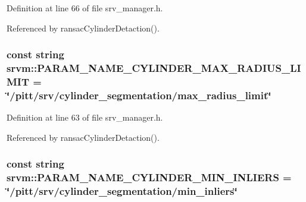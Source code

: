Definition at line 66 of file srv\-\_\-manager.\-h.



Referenced by ransac\-Cylinder\-Detaction().

\hypertarget{namespacesrvm_a85b64ea120e2c925a89075ad4efce82a}{
\subsubsection[{P\-A\-R\-A\-M\-\_\-\-N\-A\-M\-E\-\_\-\-C\-Y\-L\-I\-N\-D\-E\-R\-\_\-\-M\-A\-X\-\_\-\-R\-A\-D\-I\-U\-S\-\_\-\-L\-I\-M\-I\-T}]{\setlength{\rightskip}{0pt plus 5cm}const string srvm\-::\-P\-A\-R\-A\-M\-\_\-\-N\-A\-M\-E\-\_\-\-C\-Y\-L\-I\-N\-D\-E\-R\-\_\-\-M\-A\-X\-\_\-\-R\-A\-D\-I\-U\-S\-\_\-\-L\-I\-M\-I\-T = \char`\"{}/pitt/srv/cylinder\-\_\-segmentation/max\-\_\-radius\-\_\-limit\char`\"{}}}\label{namespacesrvm_a85b64ea120e2c925a89075ad4efce82a}


Definition at line 63 of file srv\-\_\-manager.\-h.



Referenced by ransac\-Cylinder\-Detaction().

\hypertarget{namespacesrvm_a1cf16bab1dafeefe6d5f6a58432ecbc0}{
\subsubsection[{P\-A\-R\-A\-M\-\_\-\-N\-A\-M\-E\-\_\-\-C\-Y\-L\-I\-N\-D\-E\-R\-\_\-\-M\-I\-N\-\_\-\-I\-N\-L\-I\-E\-R\-S}]{\setlength{\rightskip}{0pt plus 5cm}const string srvm\-::\-P\-A\-R\-A\-M\-\_\-\-N\-A\-M\-E\-\_\-\-C\-Y\-L\-I\-N\-D\-E\-R\-\_\-\-M\-I\-N\-\_\-\-I\-N\-L\-I\-E\-R\-S = \char`\"{}/pitt/srv/cylinder\-\_\-segmentation/min\-\_\-inliers\char`\"{}}}\label{namespacesrvm_a1cf16bab1dafeefe6d5f6a58432ecbc0}


